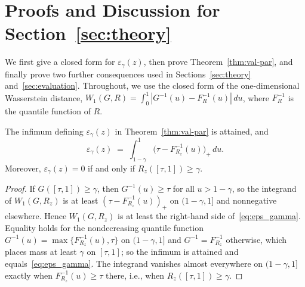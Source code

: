 \appendix

\section{Proofs and Discussion for Section~\ref{sec:theory}}
\label{app:theory}

We first give a closed form for $\varepsilon_\gamma(z)$, then prove
Theorem~\ref{thm:val-par}, and finally prove two further consequences used in
Sections~\ref{sec:theory} and~\ref{sec:evaluation}. Throughout, we use the
closed form of the one-dimensional Wasserstein distance,
$W_1(G,R)=\int_0^1|G^{-1}(u)-F_R^{-1}(u)|\,du$, where $F_R^{-1}$ is the quantile
function of $R$.

\begin{proposition}
\label{prop:compat}
The infimum defining $\varepsilon_\gamma(z)$ in Theorem~\ref{thm:val-par} is
attained, and
\begin{equation}
  \varepsilon_\gamma(z)\;=\;\int_{1-\gamma}^{1}
      \bigl(\tau-F_{R_z}^{-1}(u)\bigr)_+\,du .
  \label{eq:eps_gamma}
\end{equation}
Moreover, $\varepsilon_\gamma(z)=0$ if and only if $R_z([\tau,1])\ge\gamma$.
\end{proposition}

\begin{proof}
If $G([\tau,1])\ge\gamma$, then $G^{-1}(u)\ge\tau$ for all $u>1-\gamma$, so the
integrand of $W_1(G,R_z)$ is at least $(\tau-F_{R_z}^{-1}(u))_+$ on
$(1-\gamma,1]$ and nonnegative elsewhere. Hence $W_1(G,R_z)$ is at least the
right-hand side of~\eqref{eq:eps_gamma}. Equality holds for the nondecreasing
quantile function $G^{-1}(u)=\max\{F_{R_z}^{-1}(u),\tau\}$ on $(1-\gamma,1]$ and
$G^{-1}=F_{R_z}^{-1}$ otherwise, which places mass at least $\gamma$ on
$[\tau,1]$; so the infimum is attained and equals~\eqref{eq:eps_gamma}. The
integrand vanishes almost everywhere on $(1-\gamma,1]$ exactly when
$F_{R_z}^{-1}(u)\ge\tau$ there, i.e., when $R_z([\tau,1])\ge\gamma$.
\end{proof}

